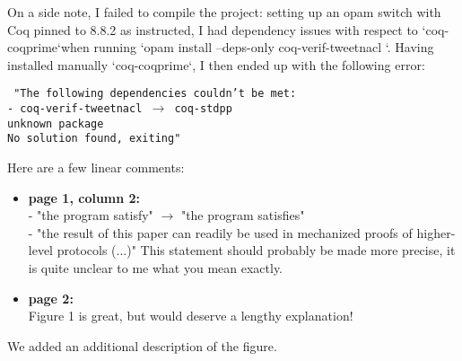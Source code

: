 On a side note, I failed to compile the project: setting up an opam switch with Coq pinned to 8.8.2 as instructed, I had dependency issues with respect to `coq-coqprime`when running `opam install --deps-only coq-verif-tweetnacl `. Having installed manually `coq-coqprime`, I then ended up with the following error:

{\footnotesize\texttt{
    "The following dependencies couldn't be met:\\
    - coq-verif-tweetnacl $\rightarrow$ coq-stdpp \\
    unknown package\\
    No solution found, exiting"}}

Here are a few linear comments:

\begin{itemize}
    \item \textbf{page 1, column 2:}\\
          - "the program satisfy" $\rightarrow$ "the program satisfies"\\
          - "the result of this paper can readily be used in mechanized proofs of higher-level protocols (...)"
          This statement should probably be made more precise, it is quite unclear to me what you mean exactly.

    \item \textbf{page 2:}\\
          Figure 1 is great, but would deserve a lengthy explanation!
\end{itemize}
\begin{answer}
    We added an additional description of the figure.
\end{answer}

